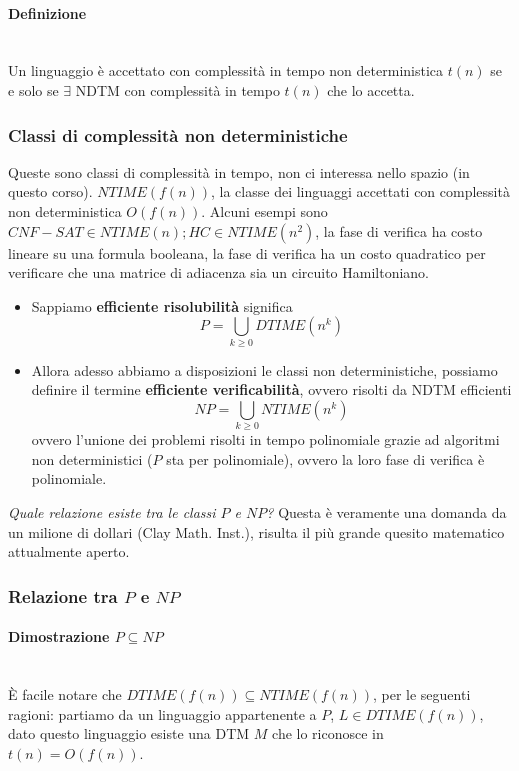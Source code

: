\documentclass{article}
\begin{document}
\paragraph{Definizione}\mbox{}\\
Un linguaggio è accettato con complessità in tempo non deterministica $t(n)$ se e solo se
$\exists$ NDTM con complessità in tempo $t(n)$ che lo accetta.

\subsubsection{Classi di complessità non deterministiche}
Queste sono classi di complessità in tempo, non ci interessa nello spazio (in questo
corso).
$NTIME(f(n))$, la classe dei linguaggi accettati con complessità non deterministica
$O(f(n))$. Alcuni esempi sono $CNF-SAT\in NTIME(n);HC\in NTIME(n^2)$, la fase
di verifica ha costo lineare su una formula booleana, la fase di verifica ha un costo
quadratico per verificare che una matrice di adiacenza sia un circuito Hamiltoniano.

\begin{itemize}
    \item Sappiamo \textbf{efficiente risolubilità} significa
    $$P=\bigcup_{k\geq 0}DTIME(n^k)$$
    \item Allora adesso abbiamo a disposizioni le classi non deterministiche, possiamo
    definire il termine \textbf{efficiente verificabilità}, ovvero risolti da NDTM
    efficienti
    $$NP=\bigcup_{k\geq 0}NTIME(n^k)$$
    ovvero l'unione dei problemi risolti in tempo polinomiale grazie ad algoritmi non
    deterministici ($P$ sta per polinomiale), ovvero la loro fase di verifica è polinomiale.
\end{itemize}
\textit{Quale relazione esiste tra le classi $P$ e $NP$?} Questa è veramente una domanda
da un milione di dollari (Clay Math. Inst.), risulta il più grande quesito matematico
attualmente aperto.

\subsubsection{Relazione tra $P$ e $NP$}
\paragraph{Dimostrazione $P\subseteq NP$}\mbox{}\\
È facile notare che $DTIME(f(n))\subseteq NTIME(f(n))$, per le seguenti ragioni:
partiamo da un linguaggio appartenente a $P$, $L\in DTIME(f(n))$, dato questo linguaggio
esiste una DTM $M$ che lo riconosce in $t(n)=O(f(n))$.
\end{document}

